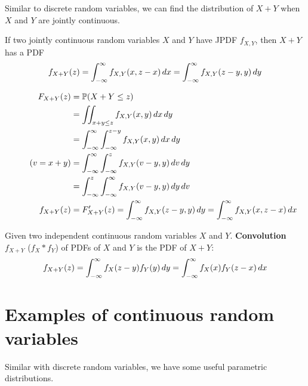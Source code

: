 \documentclass{huhtakm-template-book}
\newcommand{\prob}{\mathbb{P}}
\begin{document}
Similar to discrete random variables, we can find the distribution of $X+Y$ when $X$ and $Y$ are jointly continuous.
\begin{thm}
	If two jointly continuous random variables $X$ and $Y$ have JPDF $f_{X,Y}$, then $X+Y$ has a PDF
	\begin{equation*}
		f_{X+Y}(z)=\int_{-\infty}^{\infty} f_{X,Y}(x,z-x)\,dx=\int_{-\infty}^{\infty} f_{X,Y}(z-y,y)\,dy
	\end{equation*}
\end{thm}
\begin{proofing}
	\begin{align*}
		F_{X+Y}(z)&=\prob(X+Y\leq z)\\
		&=\iint_{x+y\leq z}f_{X,Y}(x,y)\,dx\,dy\\
		&=\intinfty\intlu{-\infty}{z-y}f_{X,Y}(x,y)\,dx\,dy\\
		\tag{$v=x+y$}
		&=\intinfty\intlu{-\infty}{z}f_{X,Y}(v-y,y)\,dv\,dy\\
		&=\intlu{-\infty}{z}\intinfty f_{X,Y}(v-y,y)\,dy\,dv\\
		f_{X+Y}(z)&=F_{X+Y}'(z)=\intinfty f_{X,Y}(z-y,y)\,dy=\intinfty f_{X,Y}(x,z-x)\,dx
	\end{align*}
\end{proofing}
\begin{defn}
	Given two independent continuous random variables $X$ and $Y$. \textbf{Convolution} $f_{X+Y}$ ($f_{X}*f_{Y}$) of PDFs of $X$ and $Y$ is the PDF of $X+Y$:
	\begin{equation*}
		f_{X+Y}(z)=\int_{-\infty}^{\infty} f_{X}(z-y)f_{Y}(y)\,dy=\int_{-\infty}^{\infty} f_{X}(x)f_{Y}(z-x)\,dx
	\end{equation*}
\end{defn}

\section{Examples of continuous random variables}
Similar with discrete random variables, we have some useful parametric distributions.
\end{document}
